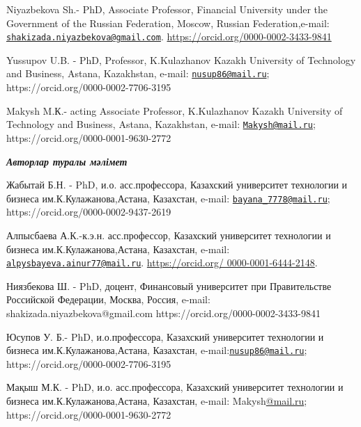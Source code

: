 Niyazbekova Sh.- PhD, Associate Professor, Financial University under
the Government of the Russian Federation, Moscow, Russian
Federation,e-mail:
\href{mailto:shakizada.niyazbekova@gmail.com}{\nolinkurl{shakizada.niyazbekova@gmail.com}}.
\url{https://orcid.org/0000-0002-3433-9841}

Yussupov U.B. - PhD, Professor, K.Kulazhanov Kazakh University of
Technology and Business, Astana, Kazakhstan, e-mail:
\href{mailto:nusup86@mail.ru}{\nolinkurl{nusup86@mail.ru}};
https://orcid.org/0000-0002-7706-3195

Makysh M.К.- acting Associate Professor, K.Kulazhanov Kazakh University
of Technology and Business, Astana, Kazakhstan, e-mail:
\href{mailto:Makysh@mail.ru}{\nolinkurl{Makysh@mail.ru}};
https://orcid.org/0000-0001-9630-2772

\emph{{\bfseries Авторлар туралы мәлімет}}

Жабытай Б.Н. - PhD, и.о. асс.профессора, Казахский университет
технологии и бизнеса им.К.Кулажанова,Астана, Казахстан, e-mail:
\href{mailto:bayana_7778@mail.ru}{\nolinkurl{bayana\_7778@mail.ru}};
https://orcid.org/0000-0002-9437-2619

Алпысбаева А.К.-к.э.н. асс.профессор, Казахский университет технологии и
бизнеса им.К.Кулажанова,Астана, Казахстан, e-mail:
\href{mailto:alpysbayeva.ainur77@mail.ru}{\nolinkurl{alpysbayeva.ainur77@mail.ru}}.
\href{https://orcid.org/\%200000-0001-6444-2148}{https://orcid.org/
0000-0001-6444-2148}.

Ниязбекова Ш. - PhD, доцент, Финансовый университет при Правительстве
Российской Федерации, Москва, Россия, e-mail:
shakizada.niyazbekova@gmail.com https://orcid.org/0000-0002-3433-9841

Юсупов У. Б.- PhD, и.о.профессора, Казахский университет технологии и
бизнеса им.К.Кулажанова,Астана, Казахстан,
e-mail:\href{mailto:nusup86@mail.ru}{\nolinkurl{nusup86@mail.ru}};
https://orcid.org/0000-0002-7706-3195

Мақыш М.К. - PhD, и.о. асс.профессора, Казахский университет технологии
и бизнеса им.К.Кулажанова,Астана, Казахстан, e-mail:
Makysh\href{mailto:bayana_7778@mail.ru}{@mail.ru};
https://orcid.org/0000-0001-9630-2772
